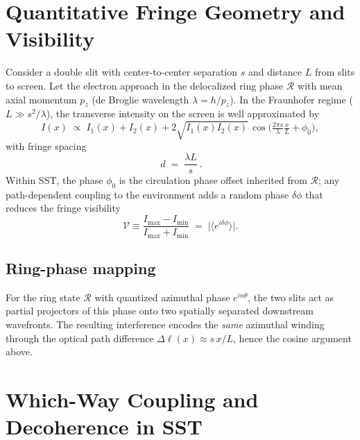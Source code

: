 \documentclass[11pt,a4paper]{article}
\begin{document}

\section{Quantitative Fringe Geometry and Visibility}

    Consider a double slit with center-to-center separation $s$ and distance $L$ from slits to screen.
    Let the electron approach in the delocalized ring phase $\mathcal R$ with mean axial momentum $p_z$ (de Broglie wavelength $\lambda=h/p_z$).
    In the Fraunhofer regime ($L \gg s^2/\lambda$), the transverse intensity on the screen is well approximated by
    \begin{equation}
    I(x) \;\propto\; I_1(x) + I_2(x) + 2\sqrt{I_1(x)I_2(x)}\,\cos\!\Big(\tfrac{2\pi s}{\lambda}\tfrac{x}{L} + \phi_0\Big),
    \end{equation}
    with fringe spacing
    \begin{equation}
    \boxed{\ d \;=\; \frac{\lambda L}{s}\ }.
    \end{equation}
    Within SST, the phase $\phi_0$ is the circulation phase offset inherited from $\mathcal R$; any path-dependent coupling to the environment adds a random phase $\delta\phi$ that reduces the fringe visibility
    \begin{equation}
    \mathcal V \equiv \frac{I_{\max}-I_{\min}}{I_{\max}+I_{\min}} \;=\; \big|\langle e^{i \delta\phi}\rangle\big|.
    \end{equation}

    \subsection{Ring-phase mapping}
        For the ring state $\mathcal R$ with quantized azimuthal phase $e^{i n\theta}$, the two slits act as partial projectors of this phase onto two spatially separated downstream wavefronts. The resulting interference encodes the \emph{same} azimuthal winding through the optical path difference $\Delta \ell(x) \approx s\,x/L$, hence the cosine argument above.

\section{Which-Way Coupling and Decoherence in SST}
\end{document}

